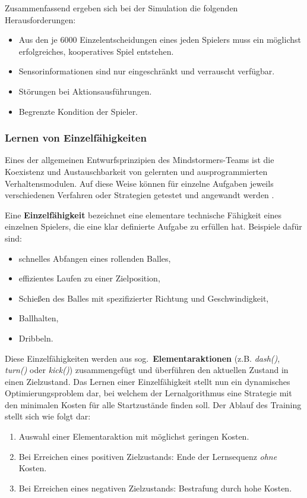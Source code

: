 Zusammenfassend ergeben sich bei der Simulation die folgenden Herausforderungen:

\begin{itemize}
  \item Aus den je 6000 Einzelentscheidungen eines jeden Spielers muss ein
  möglichst erfolgreiches, kooperatives Spiel entstehen.
  \item Sensorinformationen sind nur eingeschränkt und verrauscht verfügbar.
  \item Störungen bei Aktionsausführungen.
  \item Begrenzte Kondition der Spieler.
\end{itemize}

\subsubsection{Lernen von Einzelfähigkeiten}
Eines der allgemeinen Entwurfsprinzipien des Mindstormers-Teams ist die
Koexistenz und Austauschbarkeit von gelernten und ausprogrammierten
Verhaltensmodulen. Auf diese Weise können für einzelne Aufgaben jeweils 
verschiedenen Verfahren oder Strategien getestet und angewandt werden 
\cite{Riedmiller2006}.

Eine \textbf{Einzelfähigkeit} bezeichnet eine elementare technische Fähigkeit
eines einzelnen Spielers, die eine klar definierte Aufgabe zu erfüllen hat.
Beispiele dafür sind:

\begin{itemize}
  \item schnelles Abfangen eines rollenden Balles,
  \item effizientes Laufen zu einer Zielposition,
  \item Schießen des Balles mit spezifizierter Richtung und Geschwindigkeit,
  \item Ballhalten,
  \item Dribbeln.
\end{itemize}

Diese Einzelfähigkeiten werden aus sog.\ \textbf{Elementaraktionen} (z.B.
\textsl{dash()}, \textsl{turn()} oder \textsl{kick()}) zusammengefügt und
überführen den aktuellen Zustand in einen Zielzustand. Das Lernen einer
Einzelfähigkeit stellt nun ein dynamisches Optimierungsproblem dar, bei welchem
der Lernalgorithmus eine Strategie mit den minimalen Kosten für alle
Startzustände finden soll. Der Ablauf des Training stellt sich wie folgt dar:

\begin{enumerate}
  \item Auswahl einer Elementaraktion mit möglichst geringen Kosten.
  \item Bei Erreichen eines positiven Zielzustands: Ende der Lernsequenz
  \textsl{ohne} Kosten.
  \item Bei Erreichen eines negativen Zielzustands: Bestrafung durch hohe Kosten.
\end{enumerate}

